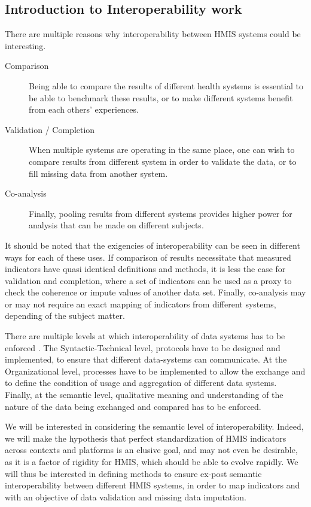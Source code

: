 \subsection{Introduction to Interoperability work}

There are multiple reasons why interoperability between HMIS systems could be interesting.
\begin{description}
\item[Comparison ] Being able to compare the results of different health systems is essential to be able to benchmark these results, or to make different systems benefit from each others' experiences.
\item[Validation / Completion] When multiple systems are operating in the same place, one can wish to compare results from different system in order to validate the data, or to fill missing data from another system.
\item[Co-analysis] Finally, pooling results from different systems provides higher power for analysis that can be made on different subjects.
\end{description}

It should be noted that the exigencies of interoperability can be seen in different ways for each of these uses. If comparison of results necessitate that measured indicators have quasi identical definitions and methods, it is less the case for validation and completion, where a set of indicators can be used as a proxy to check the coherence or impute values of another data set. Finally, co-analysis may or may not require an exact mapping of indicators from different systems, depending of the subject matter.

There are multiple levels at which interoperability of data systems  has to be enforced \cite{braa_sahay_book}. The Syntactic-Technical level, protocols have to be designed and implemented, to ensure that different data-systems can communicate. At the Organizational level, processes have to be implemented to allow the exchange and to define the condition of usage and aggregation of different data systems. Finally, at the semantic level, qualitative meaning and understanding of the nature of the data being exchanged and compared has to be enforced.

We will be interested in considering the semantic level of interoperability. Indeed, we will make the hypothesis that perfect standardization of HMIS indicators across contexts and platforms is an elusive goal, and may not even be desirable, as it is a factor of rigidity for HMIS, which should be able to evolve rapidly. We will thus be interested in defining methods to ensure ex-post semantic interoperability between different HMIS systems, in order to map indicators and with an objective of data validation and missing data imputation.

